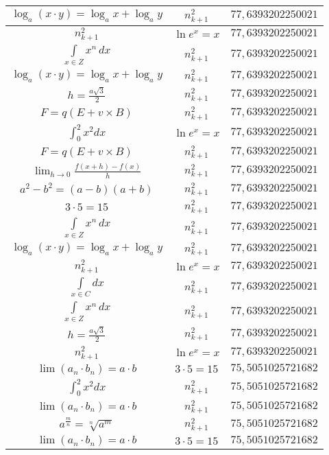 \documentclass{article}
\begin{document}
\begin{flushleft}
\begin{longtable}{|c|c|c|}
$\log_{a}(x\cdot y)=\log_{a}x+\log_{a}y$ & $n_{k+1}^2$ & $77,6393202250021$ \\ \hline 
$n_{k+1}^2$ & $\ln e^x=x$ & $77,6393202250021$ \\ \hline 
$\int \limits_{x\in Z}\!x^{n}\,dx$ & $n_{k+1}^2$ & $77,6393202250021$ \\ \hline 
$\log_{a}(x\cdot y)=\log_{a}x+\log_{a}y$ & $n_{k+1}^2$ & $77,6393202250021$ \\ \hline 
$h=\frac{a\sqrt{3}}{2}$ & $n_{k+1}^2$ & $77,6393202250021$ \\ \hline 
$F=q\left(E+v\times B\right)$ & $n_{k+1}^2$ & $77,6393202250021$ \\ \hline 
$\int _0^2x^2dx$ & $\ln e^x=x$ & $77,6393202250021$ \\ \hline 
$F=q\left(E+v\times B\right)$ & $n_{k+1}^2$ & $77,6393202250021$ \\ \hline 
$\lim_{h\to0}\frac{f(x+h)-f(x)}{h}$ & $n_{k+1}^2$ & $77,6393202250021$ \\ \hline 
$a^2-b^2=(a-b)(a+b)$ & $n_{k+1}^2$ & $77,6393202250021$ \\ \hline 
$3\cdot 5=15$ & $n_{k+1}^2$ & $77,6393202250021$ \\ \hline 
$\int \limits_{x\in Z}\!x^{n}\,dx$ & $n_{k+1}^2$ & $77,6393202250021$ \\ \hline 
$\log_{a}(x\cdot y)=\log_{a}x+\log_{a}y$ & $n_{k+1}^2$ & $77,6393202250021$ \\ \hline 
$n_{k+1}^2$ & $\ln e^x=x$ & $77,6393202250021$ \\ \hline 
$\int \limits_{x\in C}dx$ & $n_{k+1}^2$ & $77,6393202250021$ \\ \hline 
$\int \limits_{x\in Z}\!x^{n}\,dx$ & $n_{k+1}^2$ & $77,6393202250021$ \\ \hline 
$h=\frac{a\sqrt{3}}{2}$ & $n_{k+1}^2$ & $77,6393202250021$ \\ \hline 
$n_{k+1}^2$ & $\ln e^x=x$ & $77,6393202250021$ \\ \hline 
$\lim\left(a_n\cdot b_n\right)=a\cdot b$ & $3\cdot 5=15$ & $75,5051025721682$ \\ \hline 
$\int _0^2x^2dx$ & $n_{k+1}^2$ & $75,5051025721682$ \\ \hline 
$\lim\left(a_n\cdot b_n\right)=a\cdot b$ & $n_{k+1}^2$ & $75,5051025721682$ \\ \hline 
$a^{\frac{m}{n}}=\sqrt[n]{a^{m}}$ & $n_{k+1}^2$ & $75,5051025721682$ \\ \hline 
$\lim\left(a_n\cdot b_n\right)=a\cdot b$ & $3\cdot 5=15$ & $75,5051025721682$ \\ \hline 

\end{longtable}
\end{flushleft}
\end{document}
